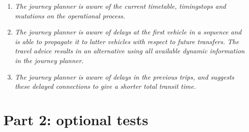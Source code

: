 \documentclass[a4paper,11pt]{article}
\begin{document}
\begin{enumerate}
\begin{enumerate}

\item \textit{The journey planner is aware of the current timetable, timingstops and mutations on the operational process.}


\item \textit{The journey planner is aware of delays at the first vehicle in a sequence and is able to propagate it to latter vehicles with respect to future transfers. The travel advice results in an alternative using all available dynamic information in the journey planner.}


\item \textit{The journey planner is aware of delays in the previous trips, and suggests these delayed connections to give a shorter total transit time.}


\end{enumerate}


\end{enumerate}



\section*{Part 2: optional tests}
\end{document}
